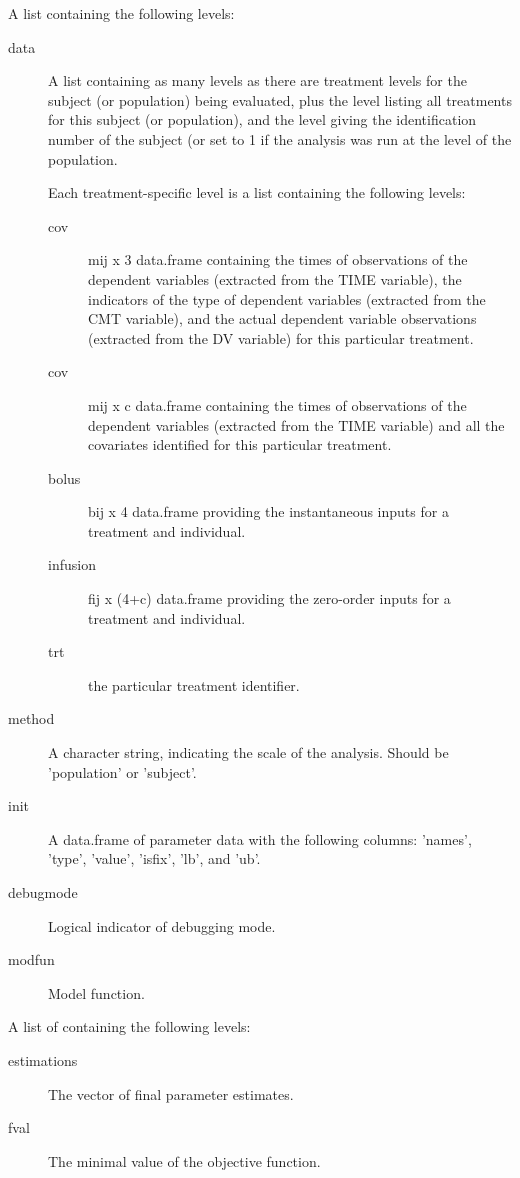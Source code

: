 \begin{Arguments}
\begin{ldescription}
\item[\code{problem}] A list containing the following levels:\begin{description}

\item[data] A list containing as many levels as there are treatment levels 
for the subject (or population) being evaluated, plus the  
level listing all treatments for this subject (or population), and the 
 level giving the identification number of the subject (or set to
1 if the analysis was run at the level of the population.

Each treatment-specific level is a list containing the following levels: 
\begin{description}

\item[cov] mij x 3 data.frame containing the times of observations of the
dependent variables (extracted from the TIME variable), the indicators
of the type of dependent variables (extracted from the CMT variable),
and the actual dependent variable observations (extracted from the 
DV variable) for this particular treatment.
\item[cov] mij x c data.frame containing the times of observations of 
the dependent variables (extracted from the TIME variable) and all the
covariates identified for this particular treatment.
\item[bolus] bij x 4 data.frame providing the instantaneous inputs 
for a treatment and individual.
\item[infusion] fij x (4+c) data.frame providing the zero-order inputs for
a treatment and individual.
\item[trt] the particular treatment identifier.
\end{description}


\item[method] A character string, indicating the scale of the analysis. Should
be 'population' or 'subject'.
\item[init] A data.frame of parameter data with the following columns:
'names', 'type', 'value', 'isfix', 'lb', and 'ub'.
\item[debugmode] Logical indicator of debugging mode.
\item[modfun] Model function.

\end{description}


\item[\code{Fit}] A list of containing the following levels:\begin{description}

\item[estimations] The vector of final parameter estimates.
\item[fval] The minimal value of the objective function.

\end{description}


\end{ldescription}
\end{Arguments}
